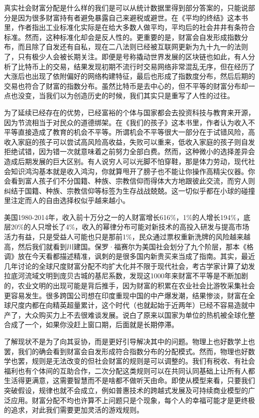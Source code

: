 \documentclass[
]{book}
\begin{document}
真实社会财富分配是什么样的我们是可以从统计数据里得到部分答案的，只能说部分是因为很多财富持有者避免暴露自己来避税或避世。在《平均的终结》这本书里，作者指出工业标准化实际是在给大多数人做平均，平均后的社会井井有条符合标准。然而，这种标准化却会是反人性的。更重要的是，财富会自发形成指数分布，而且除了自发还有自私，现在二八法则已经被互联网更新为九十九一的法则了，只有极少人会被长期关注。即便是号称撬动世界发展的区块链也如此，有人分析了比特币上的交易，结果发现初期不流行时交易网络非常混乱无序，但在经历了大涨后也出现了依附偏好的网络构建特征，最后也形成了指数度分布，然后后期的交易也符合了财富的指数分布。虽然比特币是去中心的，但不平等的财富分布却一点也没变，当我们以为创造历史的时候，我们其实只是重写了人性的过往。

为了延续已经存在的优势，已经富裕的个体与国家都会去投资科技与教育来开源，因为节流相当于对民众的道德绑架。在《我们的孩子》这本书里，作者认为收入不平等直接造成了教育的机会不平等。所谓机会不平等很大一部分在于试错风险，高收入家庭的孩子可以尝试高风险高收益，失败可以重来，低收入家庭的孩子则自发拒绝试错，因为错一次就意味着之前努力全部白费。然而，这种微小的选择差异会造成后期发展的巨大区别。有人说穷人可以光脚不怕穿鞋，那是体力劳动，现代社会知识鸿沟基本就是收入鸿沟，你就算甩开了膀子也不能让你操作高精尖仪器。你会看到富人孩子们不分国籍、种族、宗教信仰而得体大方地跟彼此交流，而穷人则纠结于国籍、种族、宗教信仰等标签为生存战战兢兢。这一切似乎都在小球的碰撞里注定而人的自由选择权似乎越来越小。

美国1980-2014年，收入前十万分之一的人财富增长616\%，1\%的人增长194\%，底层20\%的人只增长了4\%，收入的幂律分布可能对新技术的高投入研发与提高市场活力有益，只是受益人可能也只是那前1\%，民众通过票权重新洗牌的风险越来越高，然后我们就看到川建国。保罗·福赛尔为美国社会划分了九个阶层，那本《格调》放在今天看都描述精准，讽刺的是很多国内新贵买来当成了指南。其实，最近几年讨论的全球尺度财富分配不均扩大化并不限于现代社会，考古学家计算了幼发拉底河流域文明到庞贝古城的基尼系数，发现这1000年来财富不平等是不断加剧的，农业文明的出现可能是背后推手，因为财富的积累在农业社会比游牧采集社会更容易发生。很多跨国公司想在印度重现中国的中产爆发潮，结果惨淡，财富在全球尺度内都在向精英超量累计，这个时代（也就起始于近两年）已经不容易造就中产了，大众购买力上不去很难谈发展。说白了原来以国家为单位的热机被全球化整合成了一个，如果你没赶上窗口期，后面就是长期停滞。

了解现状不是为了向其妥协，而是更好引导解决其中的问题。物理上也好数学上也罢，我们的确会看到财富会自发形成符合指数分布的分配模式。然而，物理也好数学也罢，规则是无法改变的但社会财富的规则是可以调整的。我们有税收、有社会福利也有个体间的互助合作，二次分配这类规则可以在共同认同基础上让所有人都生活得更满意，这需要智慧而不是啥都不做听天由命。即使从模型来看，只要我们突破假设，规律也就不会成立，例如普惠技术的跨越式发展及可持续商业模型的广泛应用。财富分配不均也许算不上问题只是个现象，每个人的幸福可能才是更终极的追求，对此我们需要更加灵活的游戏规则。
\end{document}
